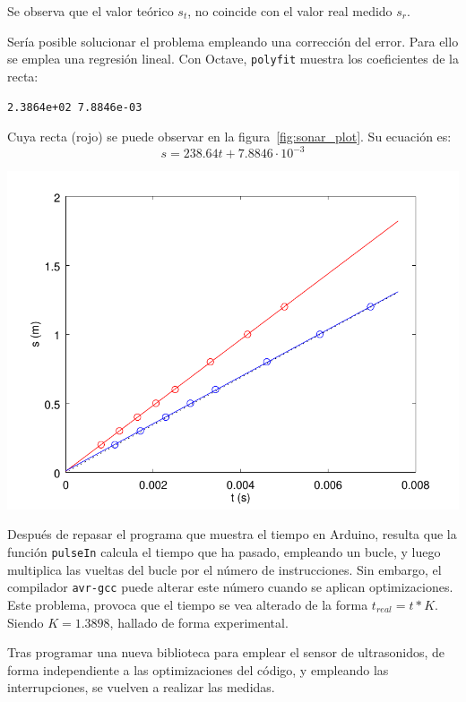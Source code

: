 \documentclass[10pt,a4paper,hidelinks]{article}
\begin{document}
\begin{multicols}{2}
Se observa que el valor teórico $s_t$, no coincide con el valor real medido 
$s_r$.

Sería posible solucionar el problema empleando una corrección del error. Para 
ello se emplea una regresión lineal. Con Octave, \texttt{polyfit} muestra los 
coeficientes de la recta:
\begin{center}
\texttt{2.3864e+02   7.8846e-03}
\end{center}
Cuya recta (rojo) se puede observar en la figura~\ref{fig:sonar_plot}. Su 
ecuación es:
$$s = 238.64t + 7.8846\cdot10^{-3}$$
\begin{center}
	\includegraphics[scale=0.58]{sonar.pdf}
\end{center}

Después de repasar el programa que muestra el tiempo en Arduino, resulta que la 
función \texttt{pulseIn} calcula el tiempo que ha pasado, empleando un bucle, y 
luego multiplica las vueltas del bucle por el número de instrucciones. Sin 
embargo, el compilador \texttt{avr-gcc} puede alterar este número cuando se 
aplican optimizaciones. Este problema, provoca que el tiempo se vea alterado de 
la forma $ t_{real} = t * K $. Siendo $ K = 1.3898 $, hallado de forma 
experimental.

Tras programar una nueva biblioteca para emplear el sensor de ultrasonidos, de 
forma independiente a las optimizaciones del código, y empleando las 
interrupciones, se vuelven a realizar las medidas.


\end{multicols}
\end{document}
